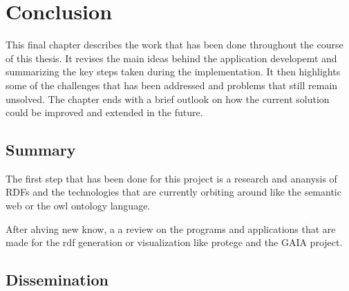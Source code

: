 \chapter{Conclusion\label{cha:chapter6}}
This final chapter describes the work that has been done throughout the course of this thesis. It revises the main ideas behind the application developemt and summarizing the key steps taken during the implementation. 
It then highlights some of the challenges that has been addressed and problems that still remain unsolved.
The chapter ends with a brief outlook on how the current solution could be improved and extended in the future.
\section{Summary\label{sec:summary}}


The first step that has been done for this project is a research and ananysis of RDFs and the technologies that are currently orbiting around like the semantic web or the owl ontology language.

After ahving new know, a a review on the programs and applications that are made for the rdf generation or visualization like protege and the GAIA project. 



\section{Dissemination\label{sec:dissemination}}

